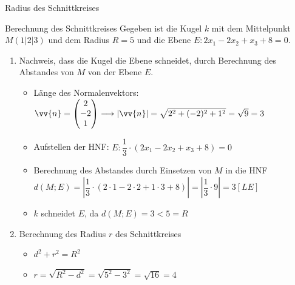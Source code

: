 \begin{b8d}{Radius des Schnittkreises}{}
\begin{center}
\end{center}

\end{b8d}
\begin{rechnung}{Berechnung des Schnittkreises}{}
Gegeben ist die Kugel \(k\) mit dem Mittelpunkt \(M(1|2|3)\) und dem Radius \(R=5\) und die Ebene \(E:2x_1-2x_2+x_3+8=0\). 
    \begin{enumerate}
        \item Nachweis, dass die Kugel die Ebene schneidet, durch Berechnung des Abstandes von \(M\) von der Ebene \(E\).
        \begin{itemize}
            \item Länge des Normalenvektors: \(\vv{n} = \begin{pmatrix}
                2\\-2\\1
            \end{pmatrix} \longrightarrow \left|\vv{n}\right| = \sqrt{2^2 + (-2)^2 +1^2} = \sqrt{9} = 3\)
            \item Aufstellen der HNF: \(E: \dfrac{1}{3} \cdot \left(2x_1-2x_2+x_3+8\right)=0\)
            \item Berechnung des Abstandes durch Einsetzen von \(M\) in die HNF\\ \(d(M;E) =\left| \dfrac{1}{3} \cdot \left(2\cdot 1 -2\cdot 2 +1\cdot 3 +8\right)\right| = \left|\dfrac{1}{3} \cdot 9\right| = 3 [LE]\)
            \item \(k\) schneidet \(E\), da \(d(M;E) = 3 < 5 = R\)
        \end{itemize}
        \item Berechnung des Radius \(r\) des Schnittkreises
        \begin{itemize}
            \item \(d^2 +r^2 = R^2\)
            \item \(r = \sqrt{R^2-d^2} = \sqrt{5^2 -3^2} = \sqrt{16} = 4\)
        \end{itemize}

\end{enumerate}
\end{rechnung}

